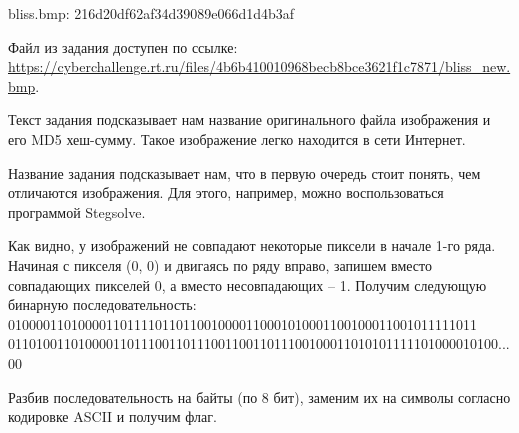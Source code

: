 
bliss.bmp: 216d20df62af34d39089e066d1d4b3af

Файл из задания доступен по ссылке: \url{https://cyberchallenge.rt.ru/files/4b6b410010968becb8bce3621f1c7871/bliss_new.bmp}.

\solutionSection

Текст задания подсказывает нам название оригинального файла изображения и его MD5 хеш-сумму. Такое изображение легко находится в сети Интернет.

Название задания подсказывает нам, что в первую очередь стоит понять, чем отличаются изображения. Для этого, например, можно воспользоваться программой Stegsolve.


Как видно, у изображений не совпадают некоторые пиксели в начале 1-го ряда. Начиная с пикселя (0, 0) и двигаясь по ряду вправо, запишем вместо совпадающих пикселей 0, а вместо несовпадающих – 1. Получим следующую бинарную последовательность: 0100001101000011011110110110010000110001010001100100011001011111011\\0110100110100001101110011011100110011011100100011010101111101000010100...00

Разбив последовательность на байты (по 8 бит), заменим их на символы согласно кодировке ASCII и получим флаг.

